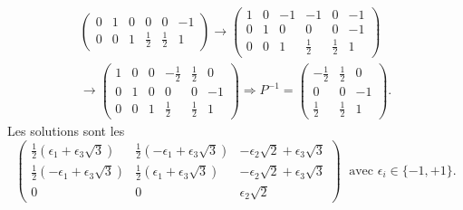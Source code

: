 \begin{enumerate}
\begin{multline*}
\begin{pmatrix}
0 & 1 & 0 & 0 & 0 & -1 \\
0 & 0 & 1 & \frac{1}{2} & \frac{1}{2} & 1
\end{pmatrix}
 \rightarrow
\begin{pmatrix}
1 & 0 & -1 & -1 & 0 & -1 \\ 
0 & 1 & 0 & 0 & 0 & -1 \\
0 & 0 & 1 & \frac{1}{2} & \frac{1}{2} & 1
\end{pmatrix} \\
 \rightarrow 
\begin{pmatrix}
1 & 0 & 0 & -\frac{1}{2} & \frac{1}{2} & 0 \\ 
0 & 1 & 0 & 0 & 0 & -1 \\
0 & 0 & 1 & \frac{1}{2} & \frac{1}{2} & 1
\end{pmatrix}
\Rightarrow 
P^{-1}=
\begin{pmatrix}
-\frac{1}{2} & \frac{1}{2} & 0 \\ 
0 & 0 & -1 \\
\frac{1}{2} & \frac{1}{2} & 1
\end{pmatrix} .
\end{multline*}
Les solutions sont les
\[
\begin{pmatrix}
\frac{1}{2}(\epsilon_1+\epsilon_3\sqrt{3}) & \frac{1}{2}(-\epsilon_1+\epsilon_3\sqrt{3}) & -\epsilon_2\sqrt{2}+\epsilon_3\sqrt{3} \\ 
\frac{1}{2}(-\epsilon_1+\epsilon_3\sqrt{3}) & \frac{1}{2}(\epsilon_1+\epsilon_3\sqrt{3}) & -\epsilon_2\sqrt{2}+\epsilon_3\sqrt{3} \\
0 & 0 & \epsilon_2\sqrt{2}
\end{pmatrix} 
\; \text{ avec } \epsilon_i\in \{-1,+1\} .
\]
\end{enumerate}

